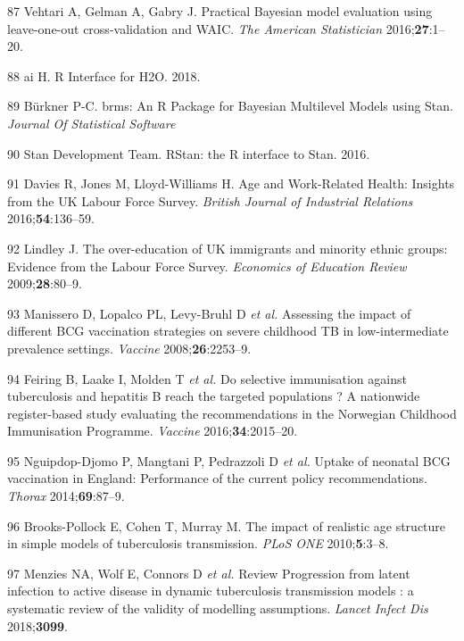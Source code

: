 \documentclass[11pt,twoside]{bristolthesis}
\begin{document}
  \leavevmode\hypertarget{ref-Vehtari2016}{}%
  87 Vehtari A, Gelman A, Gabry J. Practical Bayesian model evaluation using leave-one-out cross-validation and WAIC. \emph{The American Statistician} 2016;\textbf{27}:1--20.
  
  \leavevmode\hypertarget{ref-h2o2018}{}%
  88 ai H. R Interface for H2O. 2018.
  
  \leavevmode\hypertarget{ref-Burkner}{}%
  89 Bürkner P-C. brms: An R Package for Bayesian Multilevel Models using Stan. \emph{Journal Of Statistical Software}
  
  \leavevmode\hypertarget{ref-StanDevelopmentTeam2016}{}%
  90 Stan Development Team. RStan: the R interface to Stan. 2016.
  
  \leavevmode\hypertarget{ref-Davies2016a}{}%
  91 Davies R, Jones M, Lloyd-Williams H. Age and Work-Related Health: Insights from the UK Labour Force Survey. \emph{British Journal of Industrial Relations} 2016;\textbf{54}:136--59.
  
  \leavevmode\hypertarget{ref-Lindley2009}{}%
  92 Lindley J. The over-education of UK immigrants and minority ethnic groups: Evidence from the Labour Force Survey. \emph{Economics of Education Review} 2009;\textbf{28}:80--9.
  
  \leavevmode\hypertarget{ref-Manissero2008}{}%
  93 Manissero D, Lopalco PL, Levy-Bruhl D \emph{et al.} Assessing the impact of different BCG vaccination strategies on severe childhood TB in low-intermediate prevalence settings. \emph{Vaccine} 2008;\textbf{26}:2253--9.
  
  \leavevmode\hypertarget{ref-Feiring2016}{}%
  94 Feiring B, Laake I, Molden T \emph{et al.} Do selective immunisation against tuberculosis and hepatitis B reach the targeted populations ? A nationwide register-based study evaluating the recommendations in the Norwegian Childhood Immunisation Programme. \emph{Vaccine} 2016;\textbf{34}:2015--20.
  
  \leavevmode\hypertarget{ref-Nguipdop-Djomo2014}{}%
  95 Nguipdop-Djomo P, Mangtani P, Pedrazzoli D \emph{et al.} Uptake of neonatal BCG vaccination in England: Performance of the current policy recommendations. \emph{Thorax} 2014;\textbf{69}:87--9.
  
  \leavevmode\hypertarget{ref-Brooks-Pollock2010a}{}%
  96 Brooks-Pollock E, Cohen T, Murray M. The impact of realistic age structure in simple models of tuberculosis transmission. \emph{PLoS ONE} 2010;\textbf{5}:3--8.
  
  \leavevmode\hypertarget{ref-Menzies2018}{}%
  97 Menzies NA, Wolf E, Connors D \emph{et al.} Review Progression from latent infection to active disease in dynamic tuberculosis transmission models : a systematic review of the validity of modelling assumptions. \emph{Lancet Infect Dis} 2018;\textbf{3099}.
  
\end{document}
